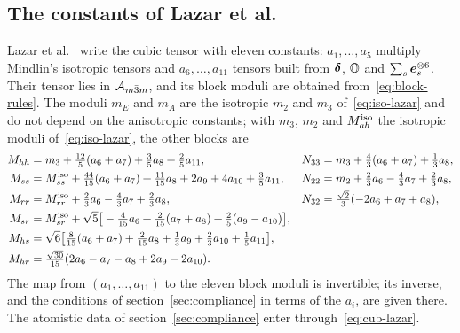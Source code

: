 \subsection{The constants of Lazar et al.}\label{sec:cubic-lazar}

Lazar et al.~\cite[eq.~(40)]{Lazar2022} write the cubic tensor with eleven constants:
$a_1,\dots,a_5$ multiply Mindlin's isotropic tensors and $a_6,\dots,a_{11}$ tensors built
from $\bm{\delta}$, $\mathbb{O}$ and $\sum_s\bm e_s^{\otimes6}$. Their tensor lies in $\mathcal{A}_{m\bar{3}m}$, and
its block moduli are obtained from~\eqref{eq:block-rules}. The moduli $m_E$ and $m_A$ are
the isotropic $m_2$ and $m_3$ of~\eqref{eq:iso-lazar} and do not depend on the anisotropic
constants; with $m_3$, $m_2$ and $M^{\mathrm{iso}}_{ab}$ the isotropic moduli
of~\eqref{eq:iso-lazar}, the other blocks are
\begin{equation}
\begin{aligned}
M_{hh}&=m_3+\tfrac{12}{5}(a_6+a_7)+\tfrac35a_8+\tfrac25a_{11},&
N_{33}&=m_3+\tfrac43(a_6+a_7)+\tfrac13a_8,\\
M_{ss}&=M^{\mathrm{iso}}_{ss}+\tfrac{44}{15}(a_6+a_7)+\tfrac{11}{15}a_8+2a_9+4a_{10}+\tfrac35a_{11},&
N_{22}&=m_2+\tfrac23a_6-\tfrac43a_7+\tfrac23a_8,\\
M_{rr}&=M^{\mathrm{iso}}_{rr}+\tfrac23a_6-\tfrac43a_7+\tfrac23a_8,&
N_{32}&=\tfrac{\sqrt2}{3}(-2a_6+a_7+a_8),\\
M_{sr}&=M^{\mathrm{iso}}_{sr}+\sqrt5\big[-\tfrac4{15}a_6+\tfrac2{15}(a_7+a_8)+\tfrac25(a_9-a_{10})\big],\\
M_{hs}&=\sqrt6\big[\tfrac8{15}(a_6+a_7)+\tfrac2{15}a_8+\tfrac13a_9+\tfrac23a_{10}+\tfrac15a_{11}\big],\\
M_{hr}&=\tfrac{\sqrt{30}}{15}(2a_6-a_7-a_8+2a_9-2a_{10}).
\end{aligned}\label{eq:cub-lazar}
\end{equation}
The map from $(a_1,\dots,a_{11})$ to the eleven block moduli is invertible; its inverse,
and the conditions of section~\ref{sec:compliance} in terms of the $a_i$, are given there.
The atomistic data of section~\ref{sec:compliance} enter through~\eqref{eq:cub-lazar}.

\begin{table}[pos=tbp]
\caption{Structure of the isotropic, cubic and hexagonal algebras on the strain-gradient
space $\Vsg$. For each irreducible representation $p$ of the rotation group ($\SOrth$,
$O$ or $D_6$): its dimension $\dimirr{p}$; the isotropic components that contain its
copies, in the order of the blocks; its multiplicity $\mult{p}$; and its contributions to
the dimension of the algebra ($\mult{p}^2$) and to the number of constants of the tensors
with major symmetry ($\tfrac12\mult{p}(\mult{p}+1)$). Hexagonal labels refer to $\bm e_1$
along an $a$ axis (section~\ref{sec:hexagonal}).}\label{tab:algebras}
\centering\small

\end{table}
